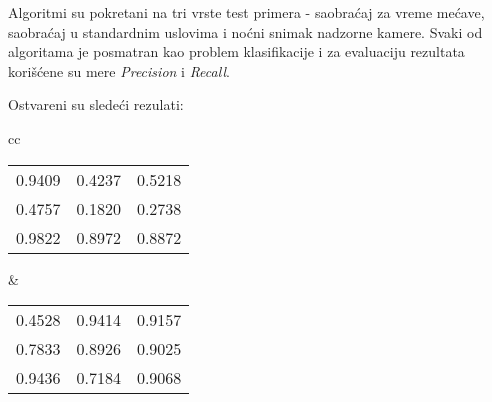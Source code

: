 \documentclass[a4paper]{article}
\begin{document}
Algoritmi su pokretani na tri vrste test primera - saobraćaj za vreme mećave, saobraćaj u standardnim uslovima i noćni snimak nadzorne kamere. Svaki od algoritama je posmatran kao problem klasifikacije i za evaluaciju rezultata korišćene su mere \emph{Precision} i \emph{Recall}.

Ostvareni su sledeći rezulati:

\vspace{5mm}

\begin{tabular}{cc}
    \begin{minipage}{.5\linewidth}
        \begin{tabular}{|l|l|l|}
    \hline
\thead{BMD} & \thead{GMM} & \thead{KNN} \\ 
                    \hline
0.9409 & 0.4237 & 0.5218 \\    \hline
0.4757 & 0.1820 & 0.2738 \\    \hline
0.9822 & 0.8972 & 0.8872 \\    \hline
\end{tabular}
    \end{minipage} &

    \begin{minipage}{.5\linewidth}
        \begin{tabular}{|l|l|l|}
    \hline
\thead{BMD} & \thead{GMM} & \thead{KNN} \\ 
                    \hline
0.4528 & 0.9414 & 0.9157 \\    \hline
0.7833 & 0.8926 & 0.9025 \\    \hline
0.9436 & 0.7184 & 0.9068 \\    \hline
\end{tabular}
    \end{minipage} 
\end{tabular}
\end{document}
